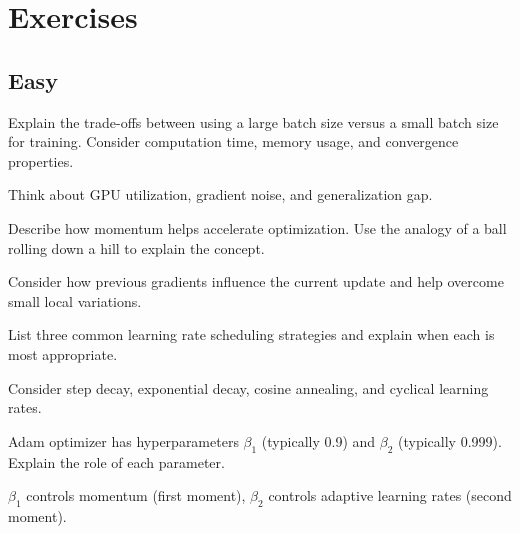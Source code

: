 
\section*{Exercises}

\subsection*{Easy}

\begin{exercisebox}[easy]
\begin{problem}
Explain the trade-offs between using a large batch size versus a small batch size for training. Consider computation time, memory usage, and convergence properties.
\end{problem}
\begin{hintbox}
Think about GPU utilization, gradient noise, and generalization gap.
\end{hintbox}
\end{exercisebox}


\begin{exercisebox}[easy]
\begin{problem}
Describe how momentum helps accelerate optimization. Use the analogy of a ball rolling down a hill to explain the concept.
\end{problem}
\begin{hintbox}
Consider how previous gradients influence the current update and help overcome small local variations.
\end{hintbox}
\end{exercisebox}


\begin{exercisebox}[easy]
\begin{problem}
List three common learning rate scheduling strategies and explain when each is most appropriate.
\end{problem}
\begin{hintbox}
Consider step decay, exponential decay, cosine annealing, and cyclical learning rates.
\end{hintbox}
\end{exercisebox}


\begin{exercisebox}[easy]
\begin{problem}
Adam optimizer has hyperparameters $\beta_1$ (typically 0.9) and $\beta_2$ (typically 0.999). Explain the role of each parameter.
\end{problem}
\begin{hintbox}
$\beta_1$ controls momentum (first moment), $\beta_2$ controls adaptive learning rates (second moment).
\end{hintbox}
\end{exercisebox}


